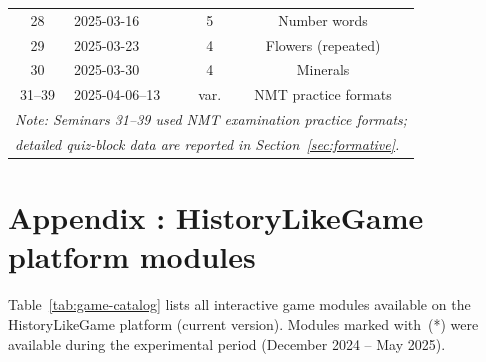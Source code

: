 \begin{table}[!h]
\begin{tabular}{clcc}
28 & 2025-03-16 & 5 & Number words \\
29 & 2025-03-23 & 4 & Flowers (repeated) \\
30 & 2025-03-30 & 4 & Minerals \\
31--39 & 2025-04-06--13 & var. & NMT practice formats \\
\hline
\multicolumn{4}{l}{\footnotesize\textit{Note: Seminars 31--39 used NMT examination practice formats;}} \\
\multicolumn{4}{l}{\footnotesize\textit{detailed quiz-block data are reported in Section~\ref{sec:formative}.}} \\
\end{tabular}
\end{table}

\setcounter{table}{0}\setcounter{figure}{0}
\label{app:B}
\section*{Appendix \theappx: HistoryLikeGame platform modules}

Table~\ref{tab:game-catalog} lists all interactive game modules available on the HistoryLikeGame platform (current version). Modules marked with~(*) were available during the experimental period (December 2024 -- May 2025).


